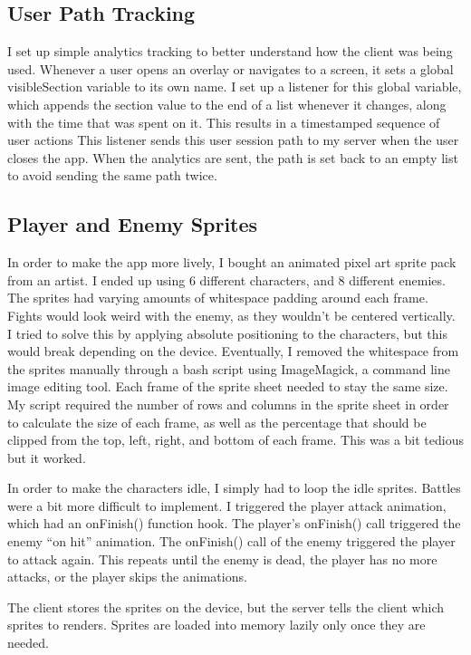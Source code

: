 \documentclass{l4proj}
\begin{document}
\subsection{User Path Tracking}
I set up simple analytics tracking to better understand how the client was being used. Whenever a user opens an overlay or navigates to a screen, it sets a global visibleSection variable to its own name. I set up a listener for this global variable, which appends the section value to the end of a list whenever it changes, along with the time that was spent on it. This results in a timestamped sequence of user actions  This listener sends this user session path to my server when the user closes the app. When the analytics are sent, the path is set back to an empty list to avoid sending the same path twice.

\subsection{Player and Enemy Sprites}
In order to make the app more lively, I bought an animated pixel art sprite pack from an artist. I ended up using 6 different characters, and 8 different enemies. The sprites had varying amounts of whitespace padding around each frame. Fights would look weird with the enemy, as they wouldn't be centered vertically. I tried to solve this by applying absolute positioning to the characters, but this would break depending on the device. Eventually, I removed the whitespace from the sprites manually through a bash script using ImageMagick, a command line image editing tool. Each frame of the sprite sheet needed to stay the same size. My script required the number of rows and columns in the sprite sheet in order to calculate the size of each frame, as well as the percentage that should be clipped from the top, left, right, and bottom of each frame. This was a bit tedious but it worked.

In order to make the characters idle, I simply had to loop the idle sprites. Battles were a bit more difficult to implement. I triggered the player attack animation, which had an onFinish() function hook. The player's onFinish() call triggered the enemy ``on hit'' animation. The onFinish() call of the enemy triggered the player to attack again. This repeats until the enemy is dead, the player has no more attacks, or the player skips the animations.

The client stores the sprites on the device, but the server tells the client which sprites to renders. Sprites are loaded into memory lazily only once they are needed.
\end{document}
